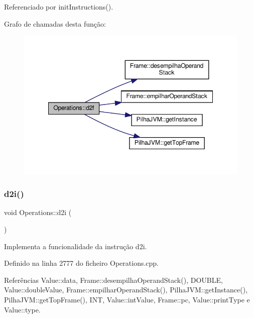 Referenciado por init\+Instructions().

Grafo de chamadas desta função\+:\nopagebreak
\begin{figure}[H]
\begin{center}
\leavevmode
\includegraphics[width=348pt]{classOperations_ab5a2d770d297ace1ec0e40d3fed9f0e3_cgraph}
\end{center}
\end{figure}
\mbox{\label{classOperations_aa8cda1c04343e047078b72b51c575e1c}} 
\subsubsection{\texorpdfstring{d2i()}{d2i()}}
{\footnotesize\ttfamily void Operations\+::d2i (\begin{DoxyParamCaption}{ }\end{DoxyParamCaption})\hspace{0.3cm}{\ttfamily [private]}}



Implementa a funcionalidade da instrução d2i. 



Definido na linha 2777 do ficheiro Operations.\+cpp.



Referências Value\+::data, Frame\+::desempilha\+Operand\+Stack(), D\+O\+U\+B\+LE, Value\+::double\+Value, Frame\+::empilhar\+Operand\+Stack(), Pilha\+J\+V\+M\+::get\+Instance(), Pilha\+J\+V\+M\+::get\+Top\+Frame(), I\+NT, Value\+::int\+Value, Frame\+::pc, Value\+::print\+Type e Value\+::type.



